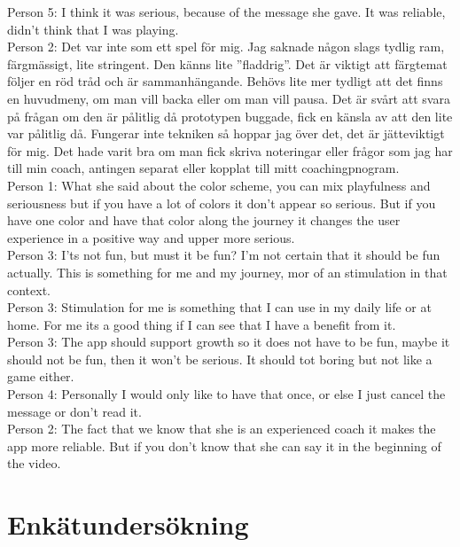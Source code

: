 Person 5: I think it was serious, because of the message she gave. It was reliable, didn’t think that I was playing. \\ 

Person 2: Det var inte som ett spel för mig.  Jag saknade någon slags tydlig ram,  färgmässigt, lite stringent. Den känns lite ”fladdrig”. Det är viktigt att färgtemat följer en röd tråd och är sammanhängande. Behövs lite mer tydligt att det finns en huvudmeny, om man vill backa eller om man vill pausa.  Det är svårt att svara på frågan om den är pålitlig då prototypen buggade, fick en känsla av att den lite var pålitlig då.  Fungerar inte tekniken så hoppar jag över det, det är jätteviktigt för mig. Det hade varit bra om man fick skriva noteringar eller frågor som jag har till min coach, antingen separat eller kopplat till mitt coachingpnogram. \\

Person 1: What she said about the color scheme, you can mix playfulness and seriousness but if you have a lot of colors it don’t appear so serious.  But if you have one color and have that color along the journey it changes the user experience in a positive way and upper more serious. \\

Person 3: I’ts not fun, but must it be fun? I’m not certain that it should be fun actually.  This is something for me and my journey, mor of an stimulation in that context. \\

Person 3: Stimulation for me is something that I can use in my daily life or at home. For me its a good thing if I can see that I have a benefit from it. \\

Person 3: The app should support growth so it does not have to be fun, maybe it should not be fun, then it won’t be serious. It should tot boring but not like a game either. \\

Person 4:  Personally I would only like to have that once, or else I just cancel the message or don’t read it. \\

Person 2: The fact that we know that she is an experienced coach it makes the app more reliable. But if you don’t know that she can say it in the beginning of the video. \\
\section{Enkätundersökning}


